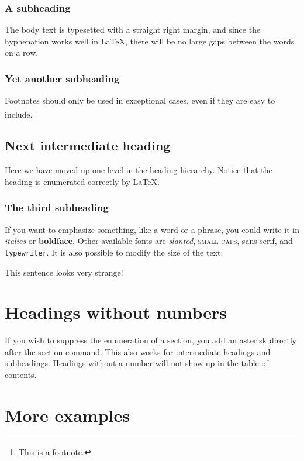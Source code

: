 \documentclass[11pt,a4paper]{article}
\begin{document}
  \subsubsection{A subheading}

  The body text is typesetted with a straight right margin, and
  since the hyphenation works well in \LaTeX, there will be no
  large gaps between the words on a row.

  \subsubsection{Yet another subheading}

  Footnotes should only be used in exceptional cases, even if
  they are easy to include.\footnote{This is a footnote.}

  \subsection{Next intermediate heading}

  Here we have moved up one level in the heading hierarchy.
  Notice that the heading is enumerated correctly by \LaTeX.

  \subsubsection{The third subheading}

  If you want to emphasize something, like a word or a phrase,
  you could write it in \emph{italics} or \textbf{boldface}.
  Other available fonts are \textsl{slanted}, \textsc{small
  caps}, \textsf{sans serif}, and \texttt{typewriter}. It is
  also possible to modify the size of the text:
  \begin{center}
    {\Large This} sentence {\LARGE looks}
    {\tiny very} {\large strange}{\Huge !}
  \end{center}
	
	\section*{Headings without numbers}

  If you wish to suppress the enumeration of a section, you
  add an asterisk directly after the section command. This
  also works for intermediate headings and subheadings.
  Headings without a number will not show up in the table of
  contents.

  \section{More examples}
\end{document}

